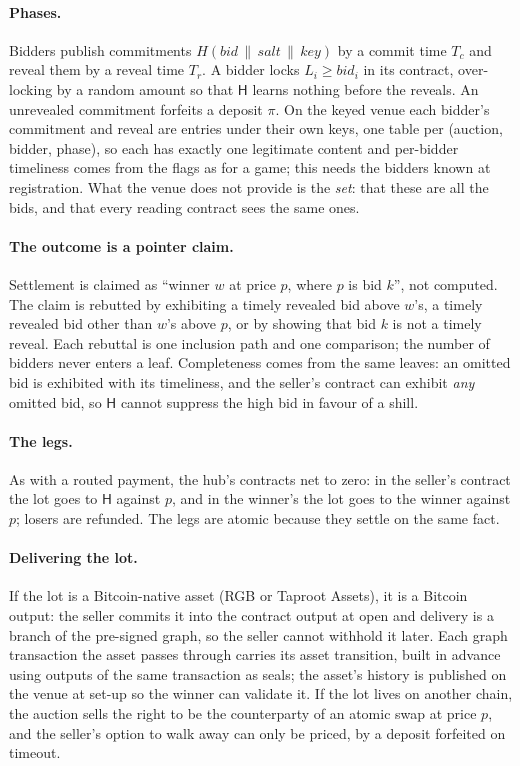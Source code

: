 \documentclass[11pt]{article}
\newcommand{\Hub}{\mathsf{H}}
\begin{document}
\paragraph{Phases.} Bidders publish commitments
$H(\mathit{bid}\,\|\,\mathit{salt}\,\|\,\mathit{key})$ by a commit time
$T_c$ and reveal them by a reveal time $T_r$. A bidder locks
$L_i \ge \mathit{bid}_i$ in its contract, over-locking by a random amount
so that $\Hub$ learns nothing before the reveals. An unrevealed
commitment forfeits a deposit $\pi$. On the keyed venue each bidder's
commitment and reveal are entries under their own keys, one table per
(auction, bidder, phase), so each has exactly one legitimate content and
per-bidder timeliness comes from the flags as for a game; this needs the
bidders known at registration. What the venue does not provide is the
\emph{set}: that these are all the bids, and that every reading contract
sees the same ones.

\paragraph{The outcome is a pointer claim.} Settlement is claimed as
``winner $w$ at price $p$, where $p$ is bid $k$'', not computed. The
claim is rebutted by exhibiting a timely revealed bid above $w$'s, a
timely revealed bid other than $w$'s above $p$, or by showing that bid
$k$ is not a timely reveal. Each rebuttal is one inclusion path and
one comparison; the number of bidders never enters a leaf. Completeness
comes from the same leaves: an omitted bid is exhibited with its
timeliness, and the seller's contract can exhibit \emph{any} omitted
bid, so $\Hub$ cannot suppress the high bid in favour of a shill.

\paragraph{The legs.} As with a routed payment, the hub's contracts net
to zero: in the seller's contract the lot goes to $\Hub$ against $p$, and
in the winner's the lot goes to the winner against $p$; losers are
refunded. The legs are atomic because they settle on the same fact.

\paragraph{Delivering the lot.} If the lot is a Bitcoin-native asset
(RGB or Taproot Assets), it is a Bitcoin output: the seller commits it
into the contract output at open and delivery is a branch of the
pre-signed graph, so the seller cannot withhold it later. Each graph
transaction the asset passes through carries its asset transition,
built in advance using outputs of the same transaction as seals; the
asset's history is published on the venue at set-up so the winner can
validate it. If the lot lives on another chain, the auction sells the
right to be the counterparty of an atomic swap at price $p$, and the
seller's option to walk away can only be priced, by a deposit forfeited
on timeout.
\end{document}
